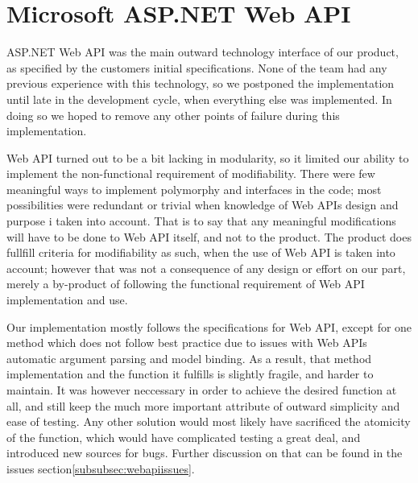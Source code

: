 \section{Microsoft ASP.NET Web API}
\label{subsec:webapiimpl}

ASP.NET Web API was the main outward technology interface of our product, as specified by the customers initial specifications. None of the team had any previous experience
with this technology, so we postponed the implementation until late in the development cycle, when everything else was implemented. In doing so we hoped to remove any other points
of failure during this implementation.

Web API turned out to be a bit lacking in modularity, so it limited our ability to implement the non-functional requirement of modifiability. There were few meaningful ways to implement
polymorphy and interfaces in the code; most possibilities were redundant or trivial when knowledge of Web APIs design and purpose i taken into account. That is to say that any meaningful
modifications will have to be done to Web API itself, and not to the product. The product does fullfill criteria for modifiability as such, when the use of Web API is taken into account;
however that was not a consequence of any design or effort on our part, merely a by-product of following the functional requirement of Web API implementation and use.

Our implementation mostly follows the specifications for Web API, except for one method which does not follow best practice due to issues with Web APIs automatic argument parsing and model binding.
As a result, that method implementation and the function it fulfills is slightly fragile, and harder to maintain. It was however neccessary in order to achieve the desired function at all, and still
keep the much more important attribute of outward simplicity and ease of testing. Any other solution would most likely have sacrificed the atomicity of the function, which would have complicated testing a great deal, and introduced new sources for bugs. Further discussion on that can be found in the issues section\ref{subsubsec:webapiissues}.
